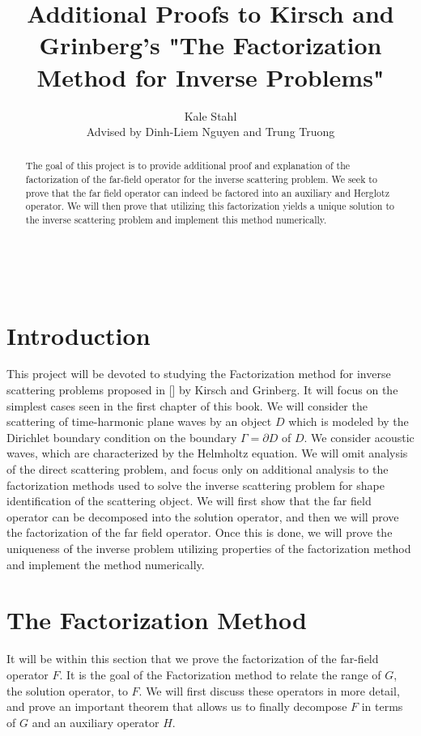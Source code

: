 \documentclass[]{article}
\title{Additional Proofs to Kirsch and Grinberg's  "The Factorization Method for Inverse Problems"}
\date{}
\author{Kale Stahl \\ \small Advised by Dinh-Liem Nguyen and Trung Truong}
\newcommand{\bd}{\textbf}
\begin{document}
		
		\makeatletter
		\begin{center}
			{\centering \Large \bd \@title}\\
			\vspace{.5cm}
			{\large \@author}
			\vspace{.25cm}
		\end{center}
		\makeatother
		\begin{abstract}
			The goal of this project is to provide additional proof and explanation of the factorization of the far-field operator for the inverse scattering problem. We seek to prove that the far field operator can indeed be factored into an auxiliary and Herglotz operator. We will then prove that utilizing this factorization yields a unique solution to the inverse scattering problem and implement this method numerically.
		\end{abstract}
		\section{Introduction}		
			This project will be devoted to studying the Factorization method for inverse scattering problems proposed in [\cite{kirschgrinberg2008}] by Kirsch and Grinberg. It will focus on the simplest cases seen in the first chapter of this book. We will consider the scattering of time-harmonic plane waves by an object $D$ which is modeled by the Dirichlet boundary condition on the boundary $\Gamma = \partial D$ of $D$. We consider acoustic waves, which are characterized by the Helmholtz equation. We will omit analysis of the direct scattering problem, and focus only on additional analysis to the factorization methods used to solve the inverse scattering problem for shape identification of the scattering object. We will first show that the far field operator can be decomposed into the solution operator, and then we will prove the factorization of the far field operator. Once this is done, we will prove the uniqueness of the inverse problem utilizing properties of the factorization method and implement the method numerically.
		\section{The Factorization Method}
			It will be within this section that we prove the factorization of the far-field operator $F$. It is the goal of the Factorization method to relate the range of $G$, the solution operator, to $F$. We will first discuss these operators in more detail, and prove an important theorem that allows us to finally decompose $F$ in terms of $G$ and an auxiliary operator $H$.
\end{document}
